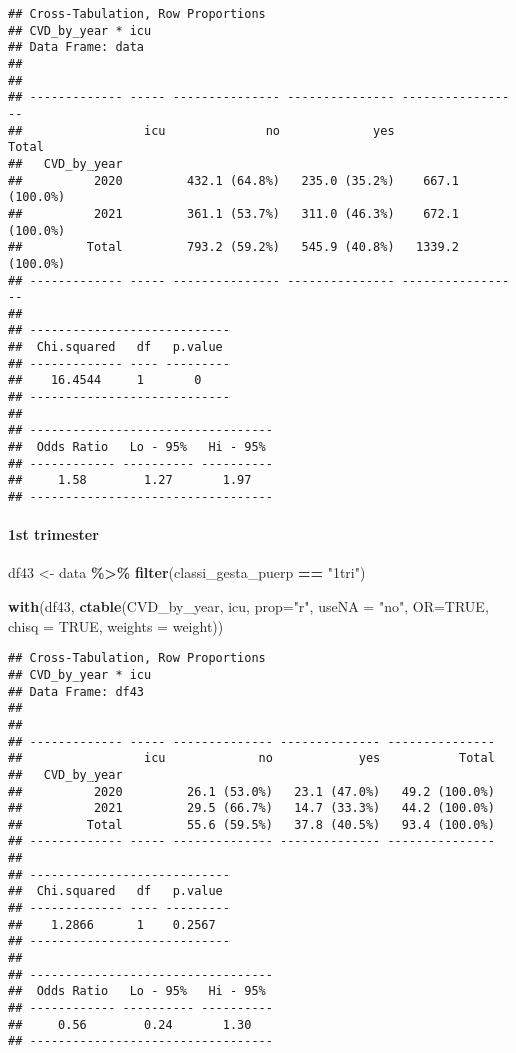 \documentclass[
]{article}
\newenvironment{Shaded}{\begin{snugshade}}{\end{snugshade}}
\newcommand{\AttributeTok}[1]{\textcolor[rgb]{0.13,0.29,0.53}{#1}}
\newcommand{\ConstantTok}[1]{\textcolor[rgb]{0.56,0.35,0.01}{#1}}
\newcommand{\FunctionTok}[1]{\textcolor[rgb]{0.13,0.29,0.53}{\textbf{#1}}}
\newcommand{\NormalTok}[1]{#1}
\newcommand{\OtherTok}[1]{\textcolor[rgb]{0.56,0.35,0.01}{#1}}
\newcommand{\SpecialCharTok}[1]{\textcolor[rgb]{0.81,0.36,0.00}{\textbf{#1}}}
\newcommand{\StringTok}[1]{\textcolor[rgb]{0.31,0.60,0.02}{#1}}
\begin{document}
\begin{verbatim}
## Cross-Tabulation, Row Proportions  
## CVD_by_year * icu  
## Data Frame: data  
## 
## 
## ------------- ----- --------------- --------------- -----------------
##                 icu              no             yes             Total
##   CVD_by_year                                                        
##          2020         432.1 (64.8%)   235.0 (35.2%)    667.1 (100.0%)
##          2021         361.1 (53.7%)   311.0 (46.3%)    672.1 (100.0%)
##         Total         793.2 (59.2%)   545.9 (40.8%)   1339.2 (100.0%)
## ------------- ----- --------------- --------------- -----------------
## 
## ----------------------------
##  Chi.squared   df   p.value 
## ------------- ---- ---------
##    16.4544     1       0    
## ----------------------------
## 
## ----------------------------------
##  Odds Ratio   Lo - 95%   Hi - 95% 
## ------------ ---------- ----------
##     1.58        1.27       1.97   
## ----------------------------------
\end{verbatim}

\hypertarget{st-trimester-9}{%
\paragraph{\texorpdfstring{{ 1st trimester
}}{ 1st trimester }}\label{st-trimester-9}}

\begin{Shaded}
\begin{Highlighting}[]
\NormalTok{df43 }\OtherTok{\textless{}{-}}\NormalTok{ data }\SpecialCharTok{\%\textgreater{}\%} 
  \FunctionTok{filter}\NormalTok{(classi\_gesta\_puerp }\SpecialCharTok{==} \StringTok{"1tri"}\NormalTok{)}

\FunctionTok{with}\NormalTok{(df43, }\FunctionTok{ctable}\NormalTok{(CVD\_by\_year, icu, }\AttributeTok{prop=}\StringTok{"r"}\NormalTok{, }\AttributeTok{useNA =} \StringTok{"no"}\NormalTok{, }\AttributeTok{OR=}\ConstantTok{TRUE}\NormalTok{, }\AttributeTok{chisq =} \ConstantTok{TRUE}\NormalTok{, }\AttributeTok{weights =}\NormalTok{ weight))}
\end{Highlighting}
\end{Shaded}

\begin{verbatim}
## Cross-Tabulation, Row Proportions  
## CVD_by_year * icu  
## Data Frame: df43  
## 
## 
## ------------- ----- -------------- -------------- ---------------
##                 icu             no            yes           Total
##   CVD_by_year                                                    
##          2020         26.1 (53.0%)   23.1 (47.0%)   49.2 (100.0%)
##          2021         29.5 (66.7%)   14.7 (33.3%)   44.2 (100.0%)
##         Total         55.6 (59.5%)   37.8 (40.5%)   93.4 (100.0%)
## ------------- ----- -------------- -------------- ---------------
## 
## ----------------------------
##  Chi.squared   df   p.value 
## ------------- ---- ---------
##    1.2866      1    0.2567  
## ----------------------------
## 
## ----------------------------------
##  Odds Ratio   Lo - 95%   Hi - 95% 
## ------------ ---------- ----------
##     0.56        0.24       1.30   
## ----------------------------------
\end{verbatim}
\end{document}
